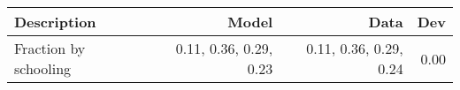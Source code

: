 \begin{tabular}{lrrr}
\hline
Description & Model  & Data  & Dev  \\ 
\hline
Fraction by schooling & 0.11, 0.36, 0.29, 0.23  & 0.11, 0.36, 0.29, 0.24  & 0.00  \\ 
\hline
\end{tabular}%
